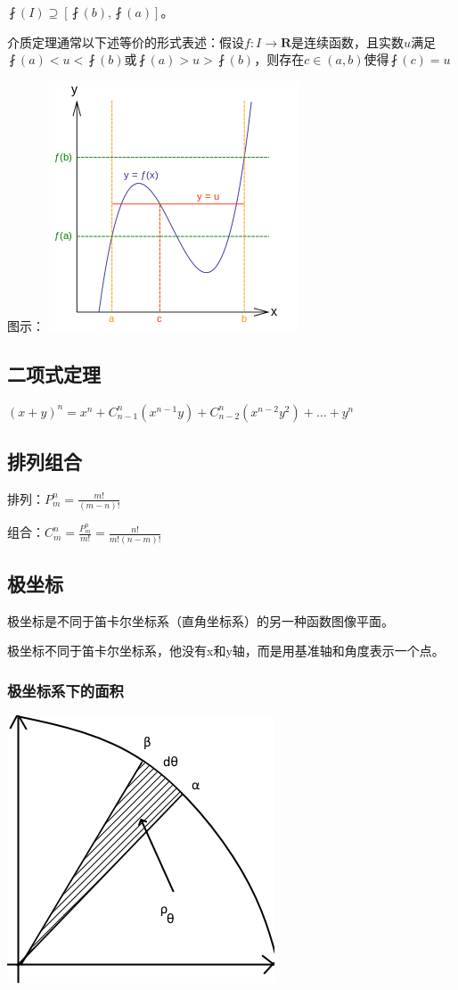 \documentclass[UTF8]{ctexbook}
\newcommand{\mathCombination}[2]{C_{#1}^{#2}}
\newcommand{\mathPermutation}[2]{P_{#1}^{#2}}
\begin{document}
{{{$\fint(I)\supseteq[\fint(b), \fint(a)]$。

介质定理通常以下述等价的形式表述：假设$f:I\rightarrow\mathbf{R}$是连续函数，且实数$u$满足$\fint(a)<u<\fint(b)$或$\fint(a)>u>\fint(b)$，则存在$c\in(a,b)$使得$\fint(c) = u$

图示：
\includegraphics{resources/Intermediatevaluetheorem.png}
}%

\subsection{二项式定理}{
  $(x + y)^n = x^n + \mathCombination{n - 1}{n}(x^{n-1} y) + \mathCombination{n - 2}{n}(x^{n-2} y^2) + \dots + y^n$
}%

\subsection{排列组合}{
  排列：$\mathPermutation{m}{n} = \frac{m!}{(m-n)!}$

  组合：$\mathCombination{m}{n} = \frac{\mathPermutation{m}{n}}{m!} = \frac{n!}{m!(n-m)!}$
}%

\subsection{极坐标}{
  极坐标是不同于笛卡尔坐标系（直角坐标系）的另一种函数图像平面。

  极坐标不同于笛卡尔坐标系，他没有x和y轴，而是用基准轴和角度表示一个点。

  \subsubsection{极坐标系下的面积}{
    \includegraphics{resources/polar_coordness.png}

}}}}
\end{document}

